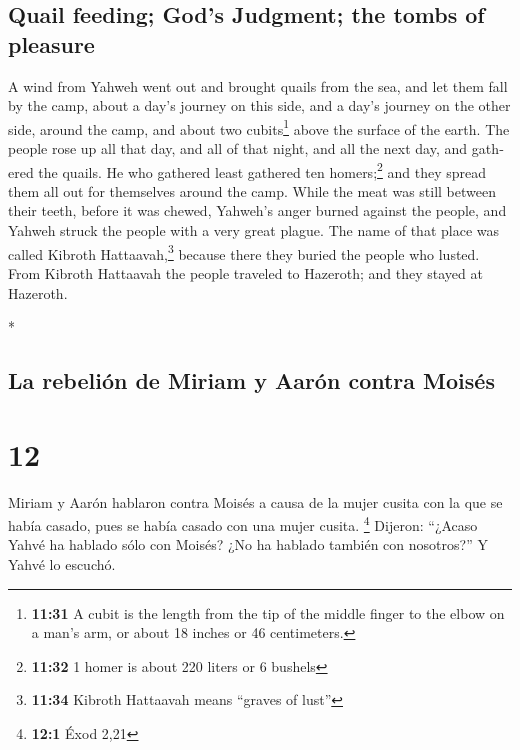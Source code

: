 \begin{paracol}{2}
\begin{otherlanguage}{english}
\hypertarget{quail-feeding-gods-judgment-the-tombs-of-pleasure}{%
\subsection{Quail feeding; God's Judgment; the tombs of
pleasure}\label{quail-feeding-gods-judgment-the-tombs-of-pleasure}}

 A wind from Yahweh went out and brought quails from the
sea, and let them fall by the camp, about a day's journey on this side,
and a day's journey on the other side, around the camp, and about two
cubits\footnote{\textbf{11:31} A cubit is the length from the tip of the
  middle finger to the elbow on a man's arm, or about 18 inches or 46
  centimeters.} above the surface of the earth.  The
people rose up all that day, and all of that night, and all the next
day, and gathered the quails. He who gathered least gathered ten
homers;\footnote{\textbf{11:32} 1 homer is about 220 liters or 6 bushels}
and they spread them all out for themselves around the camp.
 While the meat was still between their teeth, before it
was chewed, Yahweh's anger burned against the people, and Yahweh struck
the people with a very great plague.  The name of that
place was called Kibroth Hattaavah,\footnote{\textbf{11:34} Kibroth
  Hattaavah means ``graves of lust''} because there they buried the
people who lusted.  From Kibroth Hattaavah the people
traveled to Hazeroth; and they stayed at Hazeroth.

\end{otherlanguage}

\switchcolumn[0]*

\hypertarget{la-rebeliuxf3n-de-miriam-y-aaruxf3n-contra-moisuxe9s}{%
\subsection{La rebelión de Miriam y Aarón contra
Moisés}\label{la-rebeliuxf3n-de-miriam-y-aaruxf3n-contra-moisuxe9s}}

\hypertarget{section-22}{%
\section{12}\label{section-22}}

 Miriam y Aarón hablaron contra Moisés a causa de la mujer
cusita con la que se había casado, pues se había casado con una mujer
cusita. \footnote{\textbf{12:1} Éxod 2,21}  Dijeron:
``¿Acaso Yahvé ha hablado sólo con Moisés? ¿No ha hablado también con
nosotros?'' Y Yahvé lo escuchó.


\end{paracol}
